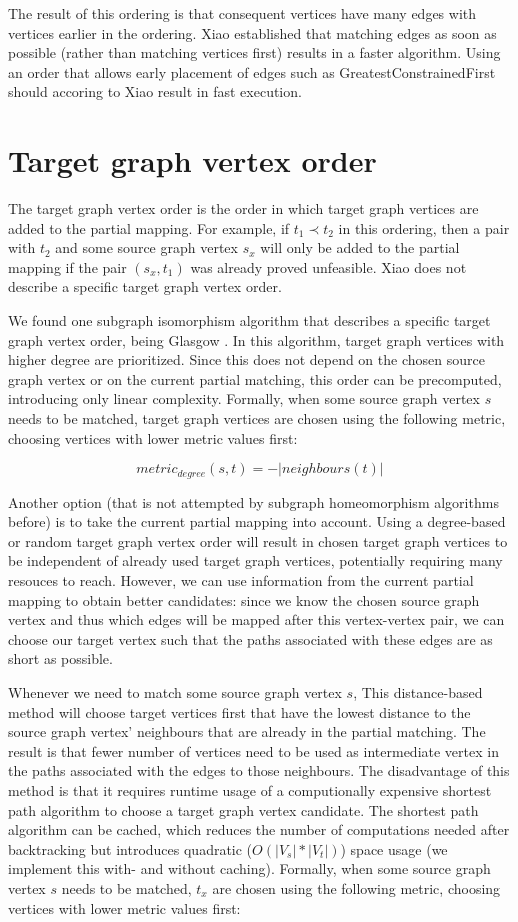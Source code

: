 The result of this ordering is that consequent vertices have many edges with vertices earlier in the ordering. Xiao established that matching edges as soon as possible (rather than matching vertices first) results in a faster algorithm. Using an order that allows early placement of edges such as GreatestConstrainedFirst should accoring to Xiao result in fast execution.
\section{Target graph vertex order}
\label{sec:targetOrder}

The target graph vertex order is the order in which target graph vertices are added to the partial mapping. For example, if $t_1 \prec t_2$ in this ordering, then a pair with $t_2$ and some source graph vertex $s_x$ will only be added to the partial mapping if the pair $(s_x, t_1)$ was already proved unfeasible. Xiao does not describe a specific target graph vertex order.

We found one subgraph isomorphism algorithm that describes a specific target graph vertex order, being Glasgow \cite{McCreesh2015}. In this algorithm, target graph vertices with higher degree are prioritized. Since this does not depend on the chosen source graph vertex or on the current partial matching, this order can be precomputed, introducing only linear complexity. Formally, when some source graph vertex $s$ needs to be matched, target graph vertices are chosen using the following metric, choosing vertices with lower metric values first:

$$\mathit{metric}_\mathit{degree}(s, t)=-|\mathit{neighbours}(t)|$$

Another option (that is not attempted by subgraph homeomorphism algorithms before) is to take the current partial mapping into account. Using a degree-based or random target graph vertex order will result in chosen target graph vertices to be independent of already used target graph vertices, potentially requiring many resouces to reach. However, we can use information from the current partial mapping to obtain better candidates: since we know the chosen source graph vertex and thus which edges will be mapped after this vertex-vertex pair, we can choose our target vertex such that the paths associated with these edges are as short as possible.

Whenever we need to match some source graph vertex $s$, This distance-based method will choose target vertices first that have the lowest distance to the source graph vertex' neighbours that are already in the partial matching. The result is that fewer number of vertices need to be used as intermediate vertex in the paths associated with the edges to those neighbours. The disadvantage of this method is that it requires runtime usage of a computionally expensive shortest path algorithm to choose a target graph vertex candidate. The shortest path algorithm can be cached, which reduces the number of computations needed after backtracking but introduces quadratic ($O(|V_s|*|V_t|)$) space usage (we implement this with- and without caching). Formally, when some source graph vertex $s$ needs to be matched, $t_x$ are chosen using the following metric, choosing vertices with lower metric values first:


